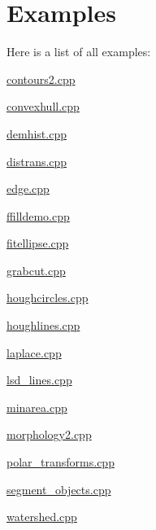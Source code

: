 \section{Examples}
Here is a list of all examples\+:\begin{DoxyCompactItemize}
\item 
\hyperlink{contours2_8cpp-example}{contours2.\+cpp}
\item 
\hyperlink{convexhull_8cpp-example}{convexhull.\+cpp}
\item 
\hyperlink{demhist_8cpp-example}{demhist.\+cpp}
\item 
\hyperlink{distrans_8cpp-example}{distrans.\+cpp}
\item 
\hyperlink{edge_8cpp-example}{edge.\+cpp}
\item 
\hyperlink{ffilldemo_8cpp-example}{ffilldemo.\+cpp}
\item 
\hyperlink{fitellipse_8cpp-example}{fitellipse.\+cpp}
\item 
\hyperlink{grabcut_8cpp-example}{grabcut.\+cpp}
\item 
\hyperlink{houghcircles_8cpp-example}{houghcircles.\+cpp}
\item 
\hyperlink{houghlines_8cpp-example}{houghlines.\+cpp}
\item 
\hyperlink{laplace_8cpp-example}{laplace.\+cpp}
\item 
\hyperlink{lsd_lines_8cpp-example}{lsd\+\_\+lines.\+cpp}
\item 
\hyperlink{minarea_8cpp-example}{minarea.\+cpp}
\item 
\hyperlink{morphology2_8cpp-example}{morphology2.\+cpp}
\item 
\hyperlink{polar_transforms_8cpp-example}{polar\+\_\+transforms.\+cpp}
\item 
\hyperlink{segment_objects_8cpp-example}{segment\+\_\+objects.\+cpp}
\item 
\hyperlink{watershed_8cpp-example}{watershed.\+cpp}
\end{DoxyCompactItemize}
